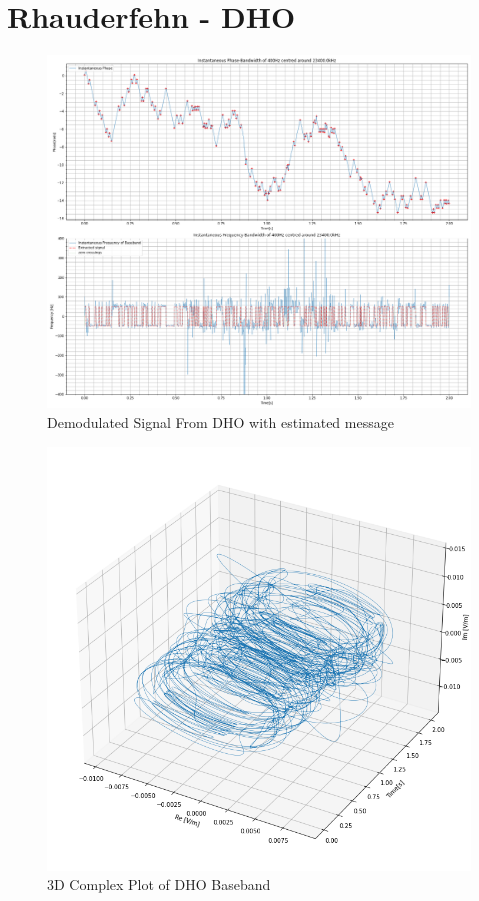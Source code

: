 \section{Rhauderfehn - DHO}
\begin{figure}[H]
    \centering
    \includegraphics[width = \textwidth]{figs/AppA/DHO.png}
    \caption{Demodulated Signal From DHO with estimated message}
    \label{fig:my_label}
\end{figure}
\begin{figure}[H]
    \centering
    \includegraphics[width = \textwidth]{figs/AppA/dho3D.png}
    \caption{3D Complex Plot of DHO Baseband}
    \label{fig:my_label}
\end{figure}

